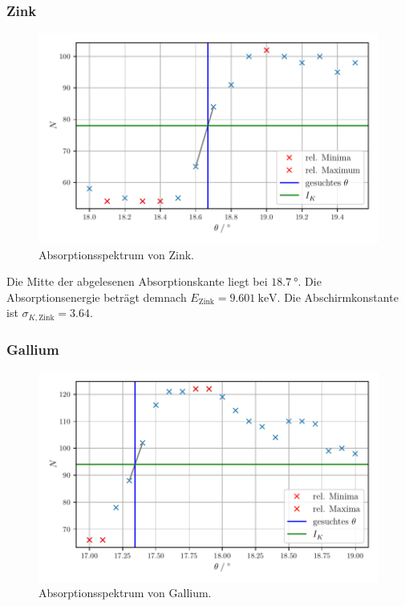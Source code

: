 \subsubsection{Zink}

\begin{figure}[H]
    \centering
    \includegraphics[width=\textwidth]{build/plot_zink.pdf}
    \caption{Absorptionsspektrum von Zink.}
    \label{fig:zink}
\end{figure}

Die Mitte der abgelesenen Absorptionskante liegt bei $\SI{18.7}{\degree}$.
Die Absorptionsenergie beträgt demnach $E_\text{Zink} = \SI{9.601}{\kilo\electronvolt}$.
Die Abschirmkonstante ist $\sigma_{K, \text{Zink}} = \num{3.64}$.

\subsubsection{Gallium}

\begin{figure}[H]
    \centering
    \includegraphics[width=\textwidth]{build/plot_gallium.pdf}
    \caption{Absorptionsspektrum von Gallium.}
    \label{fig:gallium}
\end{figure}

